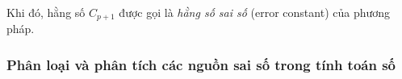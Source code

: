 Khi đó, hằng số $C_{p+1}$ được gọi là \textit{hằng số sai số} (error constant) của phương pháp.



\subsubsection{Phân loại và phân tích các nguồn sai số trong tính toán số}

